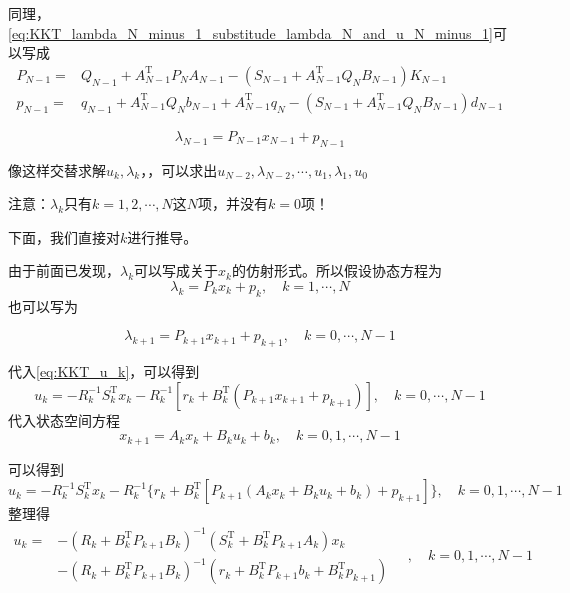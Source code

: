 \documentclass[withoutpreface,bwprint]{NoteBook}
\begin{document}
同理，\cref{eq:KKT_lambda_N_minus_1_substitude_lambda_N_and_u_N_minus_1}可以写成
\begin{align}
\label{eq:KKT_P_N_minus_1_detail}
P_{N-1}
=& Q_{N-1} 
+ A_{N-1} ^\mathrm{T}P_{N}A_{N-1}  
- \left( S_{N-1}  + A_{N-1} ^\mathrm{T}Q_{N}B_{N-1}  \right) K_{N-1}  \\

\label{eq:KKT_p_N_minus_1_detail}
p_{N-1} 
=& q_{N-1} 
+ A_{N-1} ^\mathrm{T}Q_{N}b_{N-1} 
+ A_{N-1} ^\mathrm{T} q_{N}
- \left( S_{N-1}  + A_{N-1} ^\mathrm{T}Q_{N}B_{N-1}  \right) d_{N-1} 
\end{align}

\begin{equation}
\label{eq:KKT_lambda_N_minus_1_normal_type}
\lambda_{N-1} = P_{N-1} x_{N-1} + p_{N-1}
\end{equation}


像这样交替求解$u_k,\lambda_{k}$，，可以求出$u_{N-2},\lambda_{N-2},\cdots,u_1,\lambda_1,u_0$

注意：$\lambda_{k}$只有$k=1,2,\cdots,N$这$N$项，并没有$k=0$项！



下面，我们直接对$k$​​进行推导。

由于前面已发现，$\lambda_k$可以写成关于$x_{k}$的仿射形式。所以假设协态方程为
$$
\lambda_k = P_k x_k + p_k,\quad k= 1,\cdots,N
$$
也可以写为

\begin{equation}
\label{eq:KKT_lambda_k_plus_1_normal_type}
\lambda_{k+1} = P_{k+1} x_{k+1} + p_{k+1},\quad k= 0,\cdots,N-1
\end{equation}

代入\cref{eq:KKT_u_k}​，可以得到​
$$
u_k = -R_k^{-1}S_k^\mathrm{T}x_k - R_k^{-1}\left[ r_k + B_k^\mathrm{T}\left( P_{k+1} x_{k+1} + p_{k+1}\right) \right] ,\quad k= 0,\cdots,N-1
$$
代入状态空间方程
\begin{equation}
\label{eq:KKT_x_k_plus_1_normal_type}
x_{k+1} = A_k x_k + B_k u_k + b_k, \quad k=0,1,\cdots,N-1
\end{equation}

可以得到
$$
u_k = -R_k^{-1}S_k^\mathrm{T}x_k - R_k^{-1} \{ r_k + B_k^\mathrm{T}\left[ P_{k+1} \left( A_k x_k + B_k u_k + b_k \right)+ p_{k+1} \right] \}
, \quad k=0,1,\cdots,N-1
$$
整理得
\begin{equation}
\label{eq:KKT_u_k_detail}
\begin{aligned}
u_{k} = &
-\left( R_{k}+B_{k}^\mathrm{T}P_{k+1} B_{k} \right)^{-1} \left( S_{k}^\mathrm{T} + B_{k}^\mathrm{T} P_{k+1} A_{k} \right) x_{k} \\
& - \left( R_{k}+B_{k}^\mathrm{T}P_{k+1} B_{k} \right)^{-1} \left( r_{k}+ B_{k}^\mathrm{T} P_{k+1} b_{k}+B_{k}^\mathrm{T} p_{k+1} \right)
\end{aligned}\quad
, \quad k=0,1,\cdots,N-1
\end{equation}
\end{document}
